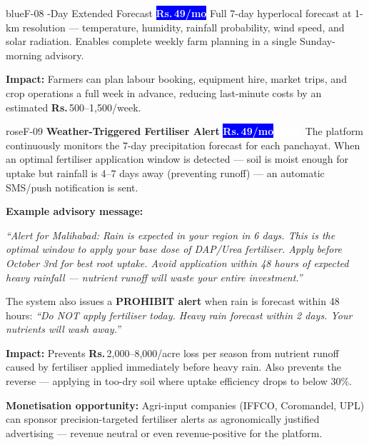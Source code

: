 \documentclass[12pt,a4paper]{article}
\newcommand{\Rup}{\textbf{Rs.\,}}
\newcommand{\saathibadge}{\textcolor{white}{\colorbox{blue}{\footnotesize\textbf{\Rup49/mo}}}}
\newcommand{\newbadge}{\textcolor{white}{\colorbox{rose}{\footnotesize\textbf{NEW}}}}
\begin{document}
\begin{featurebox}{blue}{F-08 -Day Extended Forecast \quad \saathibadge}
Full 7-day hyperlocal forecast at 1-km resolution --- temperature, humidity, rainfall probability, wind speed, and solar radiation. Enables complete weekly farm planning in a single Sunday-morning advisory.

\textbf{Impact:} Farmers can plan labour booking, equipment hire, market trips, and crop operations a full week in advance, reducing last-minute costs by an estimated \Rup500--1,500/week.
\end{featurebox}

\begin{featurebox}{rose}{F-09 \quad \textbf{Weather-Triggered Fertiliser Alert} \quad \saathibadge\quad\newbadge}
The platform continuously monitors the 7-day precipitation forecast for each panchayat. When an optimal fertiliser application window is detected --- soil is moist enough for uptake but rainfall is 4--7 days away (preventing runoff) --- an automatic SMS/push notification is sent.

\vspace{4pt}
\textbf{Example advisory message:}
\begin{mdframed}[backgroundcolor=cardBg,linecolor=primaryGreen,linewidth=1pt,roundcorner=4pt]
\textit{``Alert for Malihabad: Rain is expected in your region in 6 days. This is the optimal window to apply your base dose of DAP/Urea fertiliser. Apply before October 3rd for best root uptake. Avoid application within 48 hours of expected heavy rainfall --- nutrient runoff will waste your entire investment.''}
\end{mdframed}

\vspace{4pt}
The system also issues a \textbf{PROHIBIT alert} when rain is forecast within 48 hours: \textit{``Do NOT apply fertiliser today. Heavy rain forecast within 2 days. Your nutrients will wash away.''}

\textbf{Impact:} Prevents \Rup2,000--8,000/acre loss per season from nutrient runoff caused by fertiliser applied immediately before heavy rain. Also prevents the reverse --- applying in too-dry soil where uptake efficiency drops to below 30\%.

\textbf{Monetisation opportunity:} Agri-input companies (IFFCO, Coromandel, UPL) can sponsor precision-targeted fertiliser alerts as agronomically justified advertising --- revenue neutral or even revenue-positive for the platform.
\end{featurebox}
\end{document}

